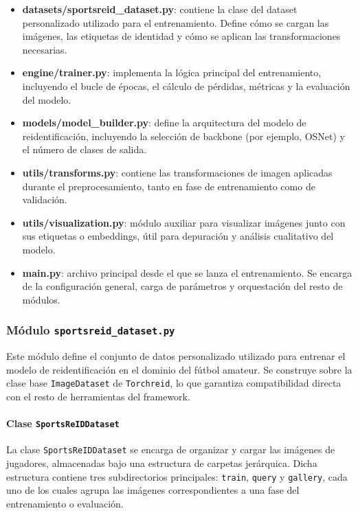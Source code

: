 \documentclass[12pt, a4paper, twoside]{article}
\begin{document}
	\begin{itemize}
		\item \textbf{datasets/sportsreid\_dataset.py}: contiene la clase del dataset personalizado utilizado para el entrenamiento. Define cómo se cargan las imágenes, las etiquetas de identidad y cómo se aplican las transformaciones necesarias.
		
		\item \textbf{engine/trainer.py}: implementa la lógica principal del entrenamiento, incluyendo el bucle de épocas, el cálculo de pérdidas, métricas y la evaluación del modelo.
		
		\item \textbf{models/model\_builder.py}: define la arquitectura del modelo de reidentificación, incluyendo la selección de backbone (por ejemplo, OSNet) y el número de clases de salida.
		
		\item \textbf{utils/transforms.py}: contiene las transformaciones de imagen aplicadas durante el preprocesamiento, tanto en fase de entrenamiento como de validación.
		
		\item \textbf{utils/visualization.py}: módulo auxiliar para visualizar imágenes junto con sus etiquetas o embeddings, útil para depuración y análisis cualitativo del modelo.
		
		\item \textbf{main.py}: archivo principal desde el que se lanza el entrenamiento. Se encarga de la configuración general, carga de parámetros y orquestación del resto de módulos.
	\end{itemize}
	
	\subsubsection{Módulo \texttt{sportsreid\_dataset.py}}
	
	Este módulo define el conjunto de datos personalizado utilizado para entrenar el modelo de reidentificación en el dominio del fútbol amateur. Se construye sobre la clase base \texttt{ImageDataset} de \texttt{Torchreid}, lo que garantiza compatibilidad directa con el resto de herramientas del framework.
	
	\paragraph{Clase \texttt{SportsReIDDataset}}
	
	La clase \texttt{SportsReIDDataset} se encarga de organizar y cargar las imágenes de jugadores, almacenadas bajo una estructura de carpetas jerárquica. Dicha estructura contiene tres subdirectorios principales: \texttt{train}, \texttt{query} y \texttt{gallery}, cada uno de los cuales agrupa las imágenes correspondientes a una fase del entrenamiento o evaluación.
	
\end{document}
